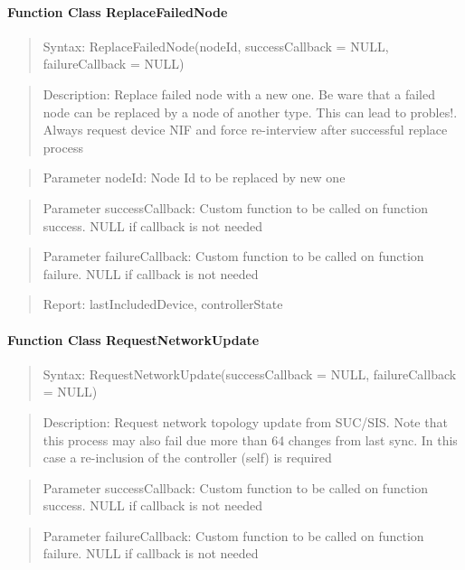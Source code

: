 \paragraph{Function Class ReplaceFailedNode}
\begin{quote}Syntax: ReplaceFailedNode(nodeId, successCallback = NULL, failureCallback = NULL)\end{quote}
\begin{quote}Description: Replace failed node with a new one. Be ware that a failed node can be replaced by a node of another type. This can lead to probles!. Always request device NIF and force re-interview after successful replace process\end{quote}
\begin{quote}Parameter nodeId: Node Id to be replaced by new one\end{quote}
\begin{quote}Parameter successCallback: Custom function to be called on function success. NULL if callback is not needed\end{quote}
\begin{quote}Parameter failureCallback: Custom function to be called on function failure. NULL if callback is not needed\end{quote}
\begin{quote}Report: lastIncludedDevice, controllerState\end{quote}

\paragraph{Function Class RequestNetworkUpdate}
\begin{quote}Syntax: RequestNetworkUpdate(successCallback = NULL, failureCallback = NULL)\end{quote}
\begin{quote}Description: Request network topology update from SUC/SIS. Note that this process may also fail due more than 64 changes from last sync. In this case a re-inclusion of the controller (self) is required\end{quote}
\begin{quote}Parameter successCallback: Custom function to be called on function success. NULL if callback is not needed\end{quote}
\begin{quote}Parameter failureCallback: Custom function to be called on function failure. NULL if callback is not needed\end{quote}


